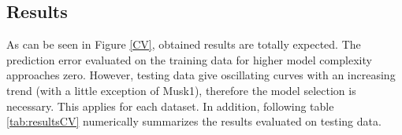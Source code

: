 \subsection{Results}
As can be seen in Figure \ref{CV}, obtained results are totally expected. The prediction error evaluated on the training data for higher model complexity approaches zero. However, testing data give oscillating curves with an increasing trend (with a little exception of Musk1), therefore the model selection is necessary. This applies for each dataset.  In addition, following table \ref{tab:resultsCV} numerically summarizes the results evaluated on testing data. 

\begin{figure}[h]
	\centering
	\

\end{figure}
